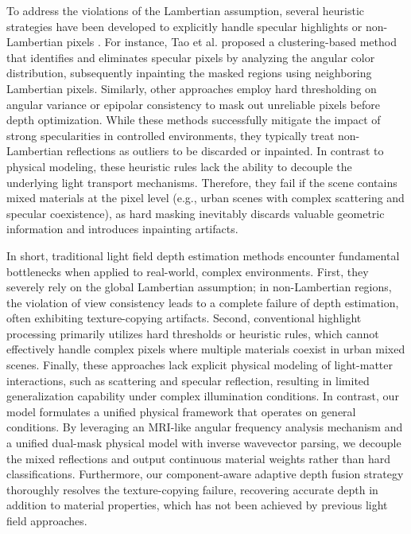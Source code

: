 \documentclass[lettersize,journal]{IEEEtran}
\begin{document}
To address the violations of the Lambertian assumption, several heuristic strategies have been developed to explicitly handle specular highlights or non-Lambertian pixels \cite{specularhighlightremovalnon}. For instance, Tao et al. \cite{Taospecularremovallightfie} proposed a clustering-based method that identifies and eliminates specular pixels by analyzing the angular color distribution, subsequently inpainting the masked regions using neighboring Lambertian pixels. Similarly, other approaches \cite{heuristicmasklightfieldrob} employ hard thresholding on angular variance or epipolar consistency to mask out unreliable pixels before depth optimization. While these methods successfully mitigate the impact of strong specularities in controlled environments, they typically treat non-Lambertian reflections as outliers to be discarded or inpainted. In contrast to physical modeling, these heuristic rules lack the ability to decouple the underlying light transport mechanisms. Therefore, they fail if the scene contains mixed materials at the pixel level (e.g., urban scenes with complex scattering and specular coexistence), as hard masking inevitably discards valuable geometric information and introduces inpainting artifacts.

In short, traditional light field depth estimation methods encounter fundamental bottlenecks when applied to real-world, complex environments. First, they severely rely on the global Lambertian assumption; in non-Lambertian regions, the violation of view consistency leads to a complete failure of depth estimation, often exhibiting texture-copying artifacts. Second, conventional highlight processing primarily utilizes hard thresholds or heuristic rules, which cannot effectively handle complex pixels where multiple materials coexist in urban mixed scenes. Finally, these approaches lack explicit physical modeling of light-matter interactions, such as scattering and specular reflection, resulting in limited generalization capability under complex illumination conditions. In contrast, our model formulates a unified physical framework that operates on general conditions. By leveraging an MRI-like angular frequency analysis mechanism and a unified dual-mask physical model with inverse wavevector parsing, we decouple the mixed reflections and output continuous material weights rather than hard classifications. Furthermore, our component-aware adaptive depth fusion strategy thoroughly resolves the texture-copying failure, recovering accurate depth in addition to material properties, which has not been achieved by previous light field approaches.
\end{document}
